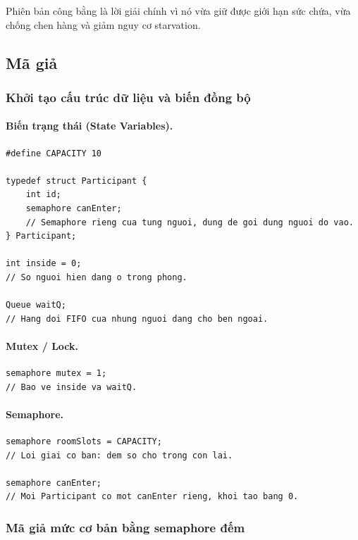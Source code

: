 Phiên bản công bằng là lời giải chính vì nó vừa giữ được giới hạn sức
chứa, vừa chống chen hàng và giảm nguy cơ starvation.

\subsection{Mã giả}

\subsubsection*{Khởi tạo cấu trúc dữ liệu và biến đồng bộ}

\paragraph{Biến trạng thái (State Variables).}

\begin{lstlisting}
#define CAPACITY 10

typedef struct Participant {
    int id;
    semaphore canEnter;
    // Semaphore rieng cua tung nguoi, dung de goi dung nguoi do vao.
} Participant;

int inside = 0;
// So nguoi hien dang o trong phong.

Queue waitQ;
// Hang doi FIFO cua nhung nguoi dang cho ben ngoai.
\end{lstlisting}

\paragraph{Mutex / Lock.}

\begin{lstlisting}
semaphore mutex = 1;
// Bao ve inside va waitQ.
\end{lstlisting}

\paragraph{Semaphore.}

\begin{lstlisting}
semaphore roomSlots = CAPACITY;
// Loi giai co ban: dem so cho trong con lai.

semaphore canEnter;
// Moi Participant co mot canEnter rieng, khoi tao bang 0.
\end{lstlisting}

\subsubsection*{Mã giả mức cơ bản bằng semaphore đếm}

